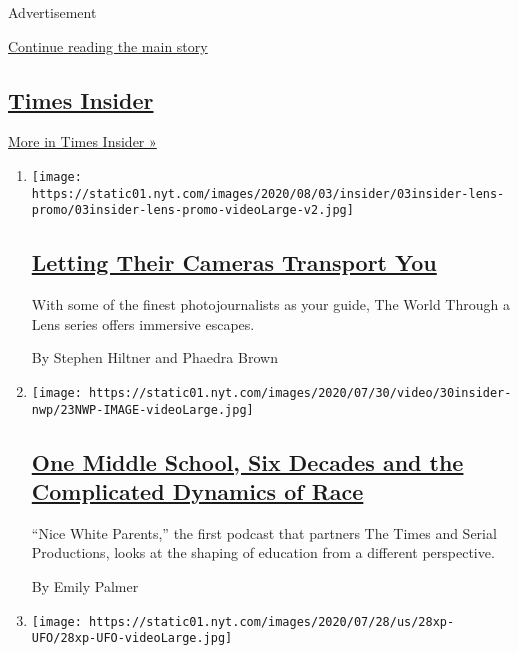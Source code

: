 Advertisement

\protect\hyperlink{after-mid1}{Continue reading the main story}

\hypertarget{times-insider-3}{%
\subsection{\texorpdfstring{\href{/series/times-insider}{Times
Insider}}{Times Insider}}\label{times-insider-3}}

\href{/series/times-insider}{More in Times Insider »}

\begin{enumerate}
\def\labelenumi{\arabic{enumi}.}
\item
  \texttt{[image: https://static01.nyt.com/images/2020/08/03/insider/03insider-lens-promo/03insider-lens-promo-videoLarge-v2.jpg]}

  \hypertarget{letting-their-cameras-transport-you}{%
  \subsection{\texorpdfstring{\href{/2020/08/03/insider/letting-their-cameras-transport-you.html}{Letting
  Their Cameras Transport
  You}}{Letting Their Cameras Transport You}}\label{letting-their-cameras-transport-you}}

  With some of the finest photojournalists as your guide, The World
  Through a Lens series offers immersive escapes.

  By Stephen Hiltner and Phaedra Brown
\item
  \texttt{[image: https://static01.nyt.com/images/2020/07/30/video/30insider-nwp/23NWP-IMAGE-videoLarge.jpg]}

  \hypertarget{one-middle-school-six-decades-and-the-complicated-dynamics-of-race}{%
  \subsection{\texorpdfstring{\href{/2020/07/30/insider/nice-white-parents.html}{One
  Middle School, Six Decades and the Complicated Dynamics of
  Race}}{One Middle School, Six Decades and the Complicated Dynamics of Race}}\label{one-middle-school-six-decades-and-the-complicated-dynamics-of-race}}

  ``Nice White Parents,'' the first podcast that partners The Times and
  Serial Productions, looks at the shaping of education from a different
  perspective.

  By Emily Palmer
\item
  \texttt{[image: https://static01.nyt.com/images/2020/07/28/us/28xp-UFO/28xp-UFO-videoLarge.jpg]}


\end{enumerate}
